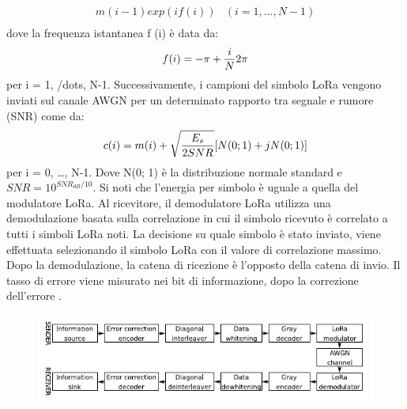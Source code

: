 \documentclass[a4paper]{report} %
\begin{document}
\begin{enumerate}
\begin{equation}
\begin{array}{rl}
m(i-1)exp(if(i)) & (i = 1, \dots, N-1)\\
\end{array}
\end{equation}
dove la frequenza istantanea f (i) è data da:
\begin{equation}
f(i) = -\pi + {i \over N} 2\pi  
\end{equation}
per i = 1, /dots, N-1. Successivamente, i campioni del simbolo LoRa vengono inviati sul canale AWGN per un determinato rapporto tra segnale e rumore (SNR) come da:
\begin{equation}
c(i) = m(i) + \sqrt{E_s \over 2SNR}[N(0; 1) + jN(0; 1)]
\end{equation}
per i = 0, \dots, N-1. Dove N(0; 1) è la distribuzione normale standard e $SNR = 10^{SNR_{dB} / 10}$. Si noti che l'energia per simbolo è uguale a quella del modulatore LoRa.
Al ricevitore, il demodulatore LoRa utilizza una demodulazione basata sulla correlazione in cui il simbolo ricevuto è correlato a tutti i simboli LoRa noti. La decisione su quale simbolo è stato inviato, viene effettuata selezionando il simbolo LoRa con il valore di correlazione massimo. Dopo la demodulazione, la catena di ricezione è l'opposto della catena di invio. Il tasso di errore viene misurato nei bit di informazione, dopo la correzione dell'errore \cite{art:rif.49}.

\begin{figure}
\centering
\includegraphics[scale=.8]{Immagini/SchemaABlocchi.png}


\end{figure}
\end{enumerate}
\end{document}
